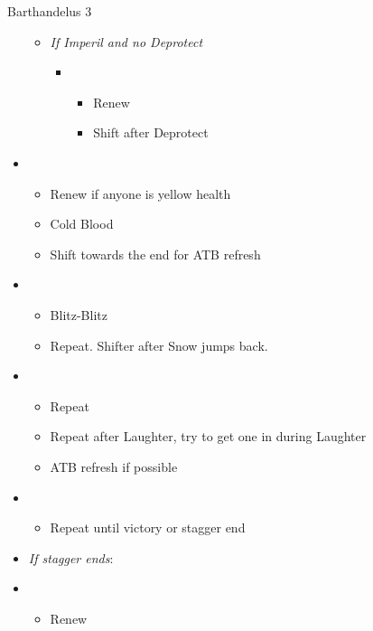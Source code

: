 \begin{battle}[1:24]{Barthandelus 3}
\begin{multicols}{2}
\begin{itemize}
\begin{itemize}
\begin{itemize}
\begin{itemize}
					                  \end{itemize}
				            \end{itemize}
				      \item \textit{If Imperil and no Deprotect}
				            \begin{itemize}
					            \item \fifth
					                  \begin{itemize}
						                  \item Renew
						                  \item Shift after Deprotect
					                  \end{itemize}
				            \end{itemize}
			      \end{itemize}
			\item \sixth
			      \begin{itemize}
				      \item Renew if anyone is yellow health
				      \item Cold Blood
				      \item Shift towards the end for ATB refresh
			      \end{itemize}
			\item \second
			      \begin{itemize}
				      \item Blitz-Blitz
				      \item Repeat. Shifter after Snow jumps back.
			      \end{itemize}
			\item \first
			      \begin{itemize}
				      \item Repeat
				      \item Repeat after Laughter, try to get one in during Laughter
				      \item ATB refresh if possible
			      \end{itemize}
			\item \second
			      \begin{itemize}
				      \item Repeat until victory or stagger end
			      \end{itemize}
			      \columnbreak
			\item \textit{If stagger ends}:
			\item \third
			      \begin{itemize}
				      \item Renew

\end{itemize}
\end{itemize}
\end{multicols}
\end{battle}
